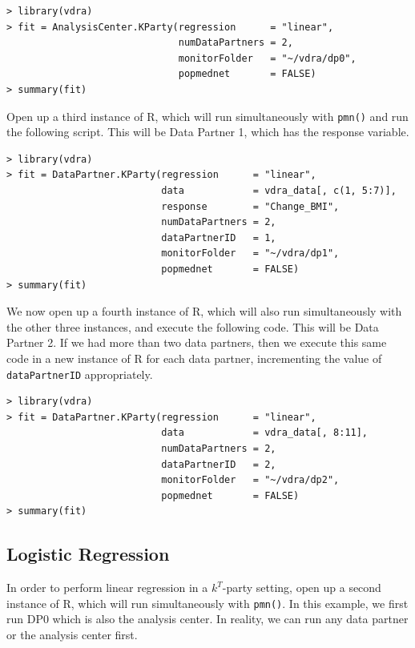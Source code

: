 \documentclass[12]{article}
\begin{document}
\begin{verbatim}
> library(vdra)
> fit = AnalysisCenter.KParty(regression      = "linear",
                              numDataPartners = 2,
                              monitorFolder   = "~/vdra/dp0",
                              popmednet       = FALSE)
> summary(fit)
\end{verbatim}

Open up a third instance of R, which will run simultaneously with \verb"pmn()" and run the following script.  This will be Data Partner 1, which has the response variable.

\begin{verbatim}
> library(vdra)
> fit = DataPartner.KParty(regression      = "linear",
                           data            = vdra_data[, c(1, 5:7)],
                           response        = "Change_BMI",
                           numDataPartners = 2,
                           dataPartnerID   = 1,
                           monitorFolder   = "~/vdra/dp1",
                           popmednet       = FALSE)
> summary(fit)
\end{verbatim}

We now open up a fourth instance of R, which will also run simultaneously with the other three instances, and execute the following code.  This will be Data Partner 2.  If we had more than two data partners, then we execute this same code in a new instance of R for each data partner, incrementing the value of \verb"dataPartnerID" appropriately.

\begin{verbatim}
> library(vdra)
> fit = DataPartner.KParty(regression      = "linear",
                           data            = vdra_data[, 8:11],
                           numDataPartners = 2,
                           dataPartnerID   = 2,
                           monitorFolder   = "~/vdra/dp2",
                           popmednet       = FALSE)
> summary(fit)
\end{verbatim}

\subsection{Logistic Regression}

In order to perform linear regression in a $k^T$-party setting, open up a second instance of R, which will run simultaneously with \verb"pmn()".  In this example, we first run DP0 which is also the analysis center.  In reality, we can run any data partner or the analysis center first.
\end{document}
